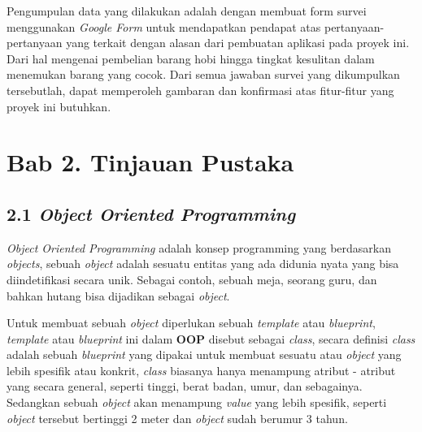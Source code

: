 \documentclass[a4paper]{article}
\begin{document}
Pengumpulan data yang dilakukan adalah dengan membuat form survei menggunakan \textit{Google Form} untuk mendapatkan pendapat atas pertanyaan-pertanyaan yang terkait dengan alasan dari pembuatan aplikasi pada proyek ini. Dari hal mengenai pembelian barang hobi hingga tingkat kesulitan dalam menemukan barang yang cocok. Dari semua jawaban survei yang dikumpulkan tersebutlah, dapat memperoleh gambaran dan konfirmasi atas fitur-fitur yang proyek ini butuhkan.

\newpage
\section*{Bab 2. Tinjauan Pustaka}


\subsection*{2.1 \textit{Object Oriented Programming}}
\textit{Object Oriented Programming} adalah konsep programming yang berdasarkan \textit{objects}, sebuah \textit{object} adalah sesuatu entitas yang ada didunia nyata yang bisa diindetifikasi secara unik\autocite{liang_liang_2021}. Sebagai contoh, sebuah meja, seorang guru, dan bahkan hutang bisa dijadikan sebagai \textit{object}.

Untuk membuat sebuah \textit{object} diperlukan sebuah \textit{template} atau \textit{blueprint}, \textit{template} atau \textit{blueprint} ini dalam \textbf{OOP} disebut sebagai \textit{class}, secara definisi \textit{class} adalah sebuah \textit{blueprint} yang dipakai untuk membuat sesuatu atau \textit{object} yang lebih spesifik atau konkrit\autocite{education-erin-oop-2020}, \textit{class} biasanya hanya menampung atribut - atribut yang secara general, seperti tinggi, berat badan, umur, dan sebagainya. Sedangkan sebuah \textit{object} akan menampung \textit{value} yang lebih spesifik, seperti \textit{object} tersebut bertinggi 2 meter dan \textit{object} sudah berumur 3 tahun.
\end{document}
